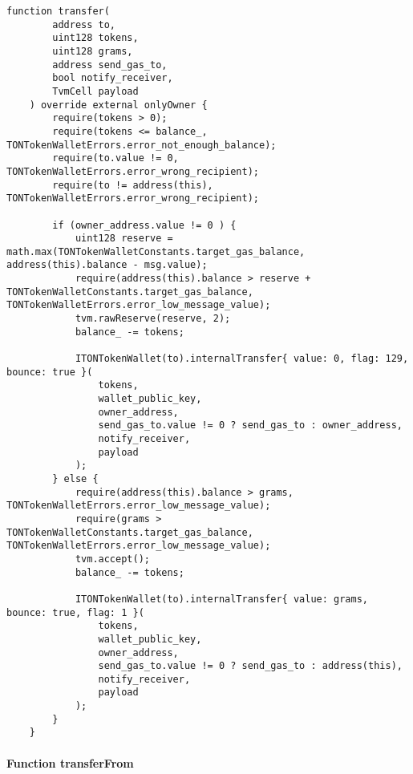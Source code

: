 \vspace{2cm}

\begin{lstlisting}[firstnumber=262]
    function transfer(
        address to,
        uint128 tokens,
        uint128 grams,
        address send_gas_to,
        bool notify_receiver,
        TvmCell payload
    ) override external onlyOwner {
        require(tokens > 0);
        require(tokens <= balance_, TONTokenWalletErrors.error_not_enough_balance);
        require(to.value != 0, TONTokenWalletErrors.error_wrong_recipient);
        require(to != address(this), TONTokenWalletErrors.error_wrong_recipient);

        if (owner_address.value != 0 ) {
            uint128 reserve = math.max(TONTokenWalletConstants.target_gas_balance, address(this).balance - msg.value);
            require(address(this).balance > reserve + TONTokenWalletConstants.target_gas_balance, TONTokenWalletErrors.error_low_message_value);
            tvm.rawReserve(reserve, 2);
            balance_ -= tokens;

            ITONTokenWallet(to).internalTransfer{ value: 0, flag: 129, bounce: true }(
                tokens,
                wallet_public_key,
                owner_address,
                send_gas_to.value != 0 ? send_gas_to : owner_address,
                notify_receiver,
                payload
            );
        } else {
            require(address(this).balance > grams, TONTokenWalletErrors.error_low_message_value);
            require(grams > TONTokenWalletConstants.target_gas_balance, TONTokenWalletErrors.error_low_message_value);
            tvm.accept();
            balance_ -= tokens;

            ITONTokenWallet(to).internalTransfer{ value: grams, bounce: true, flag: 1 }(
                tokens,
                wallet_public_key,
                owner_address,
                send_gas_to.value != 0 ? send_gas_to : address(this),
                notify_receiver,
                payload
            );
        }
    }
\end{lstlisting}

\paragraph{Function transferFrom}


